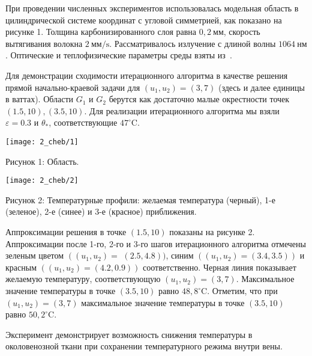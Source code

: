 При проведении численных экспериментов использовалась модельная область в
цилиндрической системе координат с угловой симметрией, как показано на рисунке 1.
Толщина карбонизированного слоя равна $0,2 \mathrm{~мм}$,
скорость вытягивания волокна $2 \mathrm{~мм}/\mathrm{s}$.
Рассматривалось излучение с длиной волны $1064 \mathrm{~нм}$.
Оптические и теплофизические параметры среды взяты
из~\cite{Opticalthermal_vanRuijven2014, Some_Poluektova2014, Endovenous_Malskat2014}.


Для демонстрации сходимости итерационного алгоритма в качестве
решения прямой начально-краевой задачи для $\left(u_{1}, u_{2}\right)=( 3,7)$
(здесь и далее единицы в ваттах).
Области $G_{1}$ и $G_{2}$ берутся как достаточно малые окрестности
точек $(1.5,10),(3.5,10)$.
Для реализации итерационного алгоритма мы взяли $\varepsilon=0.3$ и $\theta_{*}$,
соответствующие $47^{\circ} \mathrm{C}$.


\texttt{[image: 2\_cheb/1]}

Рисунок 1: Область.

\texttt{[image: 2\_cheb/2]}

Рисунок 2: Температурные профили: желаемая температура (черный),
1-е (зеленое), 2-е (синее) и 3-е (красное) приближения.

Аппроксимации решения в точке $(1.5,10)$ показаны на рисунке 2.
Аппроксимации после 1-го, 2-го и 3-го шагов итерационного
алгоритма отмечены зеленым цветом
$\left(\left(u_{1 }, u_{2}\right)=\right.$ $(2.5,4.8))$,
синим  $\left(\left(u_{1}, u_{2}\right)=(3.4,3.5)\right)$
и красным $\left(\left(u_{1}, u_{2}\right)=(4.2,0.9)\right)$ соответственно.
Черная линия показывает желаемую температуру, соответствующую
$\left(u_{1}, u_{2}\right)=(3,7)$.
Максимальное значение температуры в точке $(3.5,10)$ равно $48,8^{\circ}\mathrm{C}$.
Отметим, что при $\left(u_{1}, u_{2}\right)=(3,7)$ максимальное значение
температуры в точке $(3.5,10)$ равно $50,2^{ \circ} \mathrm{C}$.

Эксперимент демонстрирует возможность снижения температуры в
околовенозной ткани при сохранении температурного режима внутри вены.
